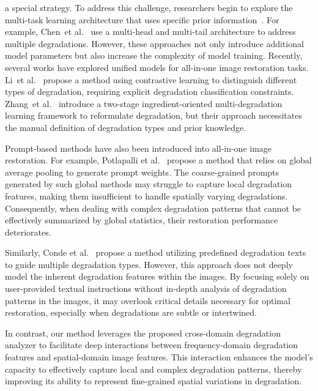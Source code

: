 a special strategy. To address this challenge, researchers begin to explore the multi-task learning architecture that uses specific prior information~\cite{Chen2020PreTrainedIP,Li2020AllIO,Jose_Valanarasu_Yasarla_Patel_2022,Liu2022TAPETP}. For example, Chen~et al.~\cite{Chen2020PreTrainedIP} use a multi-head and multi-tail architecture to address multiple degradations. However, these approaches not only introduce additional model parameters but also increase the complexity of model training. Recently, several works have explored unified models for all-in-one image restoration tasks. Li~et al.~\cite{Li2022AllInOneIR} propose a method using contrastive learning to distinguish different types of degradation, requiring explicit degradation classification constraints. Zhang~et al.~\cite{Zhang2023IngredientorientedML} introduce a two-stage ingredient-oriented multi-degradation learning framework to reformulate degradation, but their approach necessitates the manual definition of degradation types and prior knowledge.

Prompt-based methods have also been introduced into all-in-one image restoration. For example, Potlapalli et al.~\cite{PromptIR_NIPS2024} propose a method that relies on global average pooling to generate prompt weights. The coarse-grained prompts generated by such global methods may struggle to capture local degradation features, making them insufficient to handle spatially varying degradations. Consequently, when dealing with complex degradation patterns that cannot be effectively summarized by global statistics, their restoration performance deteriorates.

Similarly, Conde et al.~\cite{conde2024instructir} propose a method utilizing predefined degradation texts to guide multiple degradation types. However, this approach does not deeply model the inherent degradation features within the images. By focusing solely on user-provided textual instructions without in-depth analysis of degradation patterns in the images, it may overlook critical details necessary for optimal restoration, especially when degradations are subtle or intertwined.

In contrast, our method leverages the proposed cross-domain degradation analyzer to facilitate deep interactions between frequency-domain degradation features and spatial-domain image features. This interaction enhances the model's capacity to effectively capture local and complex degradation patterns, thereby improving its ability to represent fine-grained spatial variations in degradation. 
